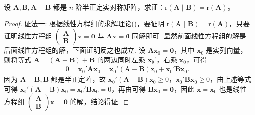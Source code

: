 \documentclass[../../main.tex]{subfiles}
\begin{document}
\begin{proposition}\label{proposition:例8.76}
设 $\boldsymbol{A},\boldsymbol{B},\boldsymbol{A}-\boldsymbol{B}$ 都是 $n$ 阶半正定实对称矩阵，求证：$\mathrm{r}\left( \boldsymbol{A}\,\,|\,\,\boldsymbol{B} \right) =\mathrm{r}(\boldsymbol{A})$。
\end{proposition}
\begin{proof}
{\color{blue}证法一:}
根据线性方程组的求解理论()，要证明 $\mathrm{r}\left( \boldsymbol{A}\,\,|\,\,\boldsymbol{B} \right) =\mathrm{r}(\boldsymbol{A})$，只要证明线性方程组 $\begin{pmatrix}
\boldsymbol{A} \\
\boldsymbol{B}
\end{pmatrix}\boldsymbol{x}=\boldsymbol{0}$ 与 $\boldsymbol{A}\boldsymbol{x}=\boldsymbol{0}$ 同解即可. 显然前面线性方程组的解是后面线性方程组的解，下面证明反之也成立. 设 $\boldsymbol{A}\boldsymbol{x}_0=\boldsymbol{0}$，其中 $\boldsymbol{x}_0$ 是实列向量，则将等式 $\boldsymbol{A}=(\boldsymbol{A}-\boldsymbol{B})+\boldsymbol{B}$ 的两边同时左乘 $\boldsymbol{x}_0'$，右乘 $\boldsymbol{x}_0$，可得
\begin{align*}
0=\boldsymbol{x}_0'\boldsymbol{A}\boldsymbol{x}_0=\boldsymbol{x}_0'(\boldsymbol{A}-\boldsymbol{B})\boldsymbol{x}_0+\boldsymbol{x}_0'\boldsymbol{B}\boldsymbol{x}_0.
\end{align*}
因为 $\boldsymbol{A}-\boldsymbol{B},\boldsymbol{B}$ 都是半正定阵，故 $\boldsymbol{x}_0'(\boldsymbol{A}-\boldsymbol{B})\boldsymbol{x}_0\geq0$，$\boldsymbol{x}_0'\boldsymbol{B}\boldsymbol{x}_0\geq0$，由上述等式可得 $\boldsymbol{x}_0'(\boldsymbol{A}-\boldsymbol{B})\boldsymbol{x}_0=\boldsymbol{x}_0'\boldsymbol{B}\boldsymbol{x}_0 = 0$，再由可得 $\boldsymbol{B}\boldsymbol{x}_0=\boldsymbol{0}$，因此 $\boldsymbol{x}=\boldsymbol{x}_0$ 也是线性方程组 $\begin{pmatrix}
\boldsymbol{A} \\
\boldsymbol{B}
\end{pmatrix}\boldsymbol{x}=\boldsymbol{0}$ 的解，结论得证.


\end{proof}
\end{document}
